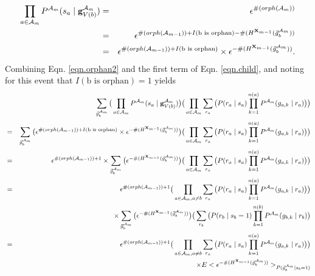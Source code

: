 \documentclass[11pt]{article}
\newcommand{\A}{{\cal A}}
\newcommand{\X}{\mathbf{X}}
\newcommand{\Am}{\A_{m}}
\begin{document}
\begin{eqnarray}
\prod_{a \in {\Am}} P^{\Am}(s_a \mid \mathbf{g}^{\Am}_{V({b})}) &=& \epsilon^{\#(orph(\Am))} \\
%
&=&\epsilon^{\#(orph(\A_{m-1})) + I(\text{b is orphan}) - \#(H^{\X_{m-1}}(\vec{g}_b^{\Am}))} \\
%
&=& \epsilon^{\#(orph(\A_{m-1})) + I(\text{b is orphan})} \times \epsilon^{- \#(H^{\X_{m-1}}(\vec{g}_b^{\Am}))} \label{eqn.orphan2}.
\end{eqnarray}
%
Combining Eqn. \ref{eqn.orphan2} and the first term of Eqn. \ref{eqn.child}, and noting for this event that $ I(\text{b is orphan})=1$ yields
\begin{eqnarray}
& &\sum_{\vec{g}^{\Am}_{b}} \big( \prod_{a \in {\Am}} P^{\Am}(s_a \mid \mathbf{g}^{\Am}_{V({b})}) \big ) \big( \prod_{a \in {\A_{m}}} \sum_{r_a} \big(P(r_a \mid s_a) \prod_{k=1}^{n(a)} P^{\Am}(g_{a,k} \mid r_a) \big) \big) \\
%
&=& \sum_{\vec{g}^{\Am}_{b}} \big(\epsilon^{\#(orph(\A_{m-1})) + I(\text{b is orphan})} \times \epsilon^{- \#(H^{\X_{m-1}}(\vec{g}_b^{\Am}))} \big)  \big( \prod_{a \in {\A_{m}}} \sum_{r_a} \big(P(r_a \mid s_a) \prod_{k=1}^{n(a)} P^{\Am}(g_{a,k} \mid r_a) \big) \big) \\
%
&=& \epsilon^{\#(orph(\A_{m-1})) + 1} \times \sum_{\vec{g}^{\Am}_{b}} \big( \epsilon^{- \#(H^{\X_{m-1}}(\vec{g}_b^{\Am}))} \big)  \big( \prod_{a \in {\A_{m}}} \sum_{r_a} \big(P(r_a \mid s_a) \prod_{k=1}^{n(a)} P^{\Am}(g_{a,k} \mid r_a) \big) \big) \\
%
&=& \epsilon^{\#(orph(\A_{m-1})) + 1} \big( \prod_{a \in {\A_{m}}, a \neq b} \sum_{r_a} \big(P(r_a \mid s_a) \prod_{k=1}^{n(a)} P^{\Am}(g_{a,k} \mid r_a) \big) \big) \label{bottomup} \\
& & \times \sum_{\vec{g}^{\Am}_{b}} \big( \epsilon^{- \#(H^{\X_{m-1}}(\vec{g}_b^{\Am}))} \big) \big( \sum_{r_b} \big(P(r_b \mid s_b = 1) \prod_{k=1}^{n(b)} P^{\Am}(g_{b,k} \mid r_b) \big) \nonumber \\
%
&=& \epsilon^{\#(orph(\A_{m-1})) + 1} \big( \prod_{a \in {\A_{m}}, a \neq b} \sum_{r_a} \big(P(r_a \mid s_a) \prod_{k=1}^{n(a)} P^{\Am}(g_{a,k} \mid r_a) \big) \big) \\
& & \times E<\epsilon^{- \#(H^{\X_{m-1}}(\vec{g}_b^{\Am}))}>_{P(\vec{g}^{\Am}_{b} \mid s_b = 1)} \nonumber
\end{eqnarray}
\end{document}
